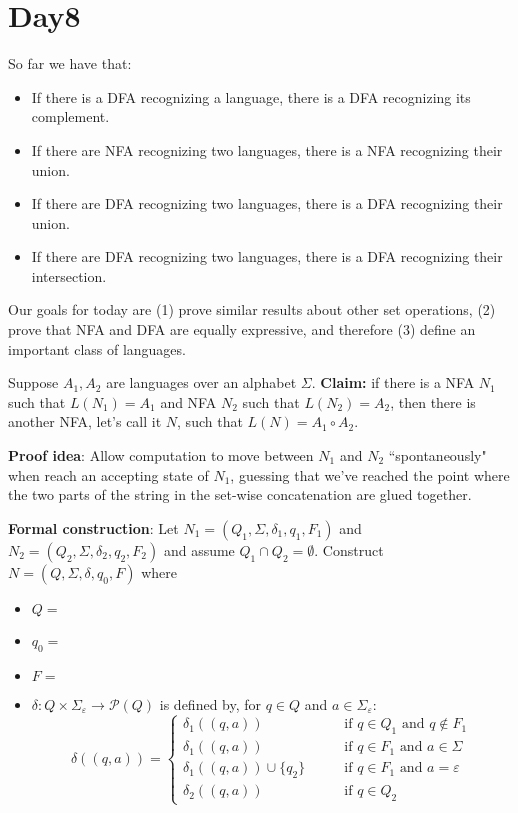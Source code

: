 \documentclass[12pt, oneside]{article}
\begin{document}
    
 \vfill
\section*{Day8}


So far we have that: 
\begin{itemize}
\item If there is a DFA recognizing a language, there is a DFA recognizing its complement.
\item If there are NFA recognizing two languages, there is a NFA recognizing their union.
\item If there are DFA recognizing two languages, there is a DFA recognizing their union.
\item If there are DFA recognizing two languages, there is a DFA recognizing their intersection.
\end{itemize}

Our goals for today are (1) prove similar results about other set operations, (2) prove that 
NFA and DFA are equally expressive, and therefore (3) define an important class of languages.

\vfill

\newpage
Suppose $A_1, A_2$ are languages over an alphabet $\Sigma$.
{\bf Claim:} if there is a NFA $N_1$ such that $L(N_1) = A_1$ and 
NFA $N_2$ such that $L(N_2) = A_2$, then there is another NFA, let's call it $N$, such that 
$L(N) = A_1 \circ A_2$.

{\bf Proof idea}: Allow computation to move between $N_1$ and $N_2$ ``spontaneously" when reach an accepting state of 
$N_1$, guessing that we've reached the point where the two parts of the string in the set-wise concatenation 
are glued together.


{\bf Formal construction}: Let 
$N_1 = (Q_1, \Sigma, \delta_1, q_1, F_1)$ and $N_2 = (Q_2, \Sigma, \delta_2,q_2, F_2)$
and assume $Q_1 \cap Q_2 = \emptyset$.
Construct $N = (Q, \Sigma, \delta, q_0, F)$ where
\begin{itemize}
    \item $Q = $
    \item $q_0 = $
    \item $F = $
    \item $\delta: Q \times \Sigma_\varepsilon \to \mathcal{P}(Q)$ is defined by, for $q \in Q$ and $a \in \Sigma_{\varepsilon}$:
        \[
            \delta((q,a))=\begin{cases}  
                \delta_1 ((q,a)) &\qquad\text{if } q\in Q_1 \textrm{ and } q \notin F_1\\ 
                \delta_1 ((q,a)) &\qquad\text{if } q\in F_1 \textrm{ and } a \in \Sigma\\ 
                \delta_1 ((q,a)) \cup \{q_2\} &\qquad\text{if } q\in F_1 \textrm{ and } a = \varepsilon\\ 
                \delta_2 ((q,a)) &\qquad\text{if } q\in Q_2
            \end{cases}
        \]
\end{itemize}
\end{document}
